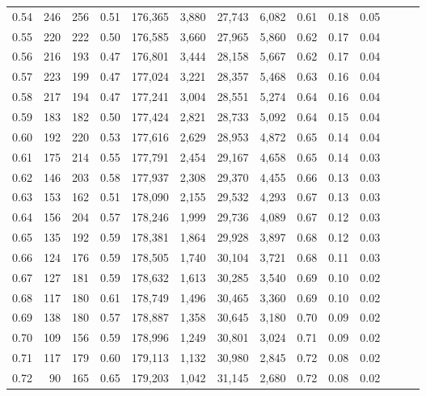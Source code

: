 \begin{tabular}{rrrrrrrrrrrrrr}
0.54 &     246 &  256 &  0.51 &  176,365 &    3,880 &  27,743 &   6,082 &  0.61 &  0.18 &      0.05 \\
0.55 &     220 &  222 &  0.50 &  176,585 &    3,660 &  27,965 &   5,860 &  0.62 &  0.17 &      0.04 \\
0.56 &     216 &  193 &  0.47 &  176,801 &    3,444 &  28,158 &   5,667 &  0.62 &  0.17 &      0.04 \\
0.57 &     223 &  199 &  0.47 &  177,024 &    3,221 &  28,357 &   5,468 &  0.63 &  0.16 &      0.04 \\
0.58 &     217 &  194 &  0.47 &  177,241 &    3,004 &  28,551 &   5,274 &  0.64 &  0.16 &      0.04 \\
0.59 &     183 &  182 &  0.50 &  177,424 &    2,821 &  28,733 &   5,092 &  0.64 &  0.15 &      0.04 \\
0.60 &     192 &  220 &  0.53 &  177,616 &    2,629 &  28,953 &   4,872 &  0.65 &  0.14 &      0.04 \\
0.61 &     175 &  214 &  0.55 &  177,791 &    2,454 &  29,167 &   4,658 &  0.65 &  0.14 &      0.03 \\
0.62 &     146 &  203 &  0.58 &  177,937 &    2,308 &  29,370 &   4,455 &  0.66 &  0.13 &      0.03 \\
0.63 &     153 &  162 &  0.51 &  178,090 &    2,155 &  29,532 &   4,293 &  0.67 &  0.13 &      0.03 \\
0.64 &     156 &  204 &  0.57 &  178,246 &    1,999 &  29,736 &   4,089 &  0.67 &  0.12 &      0.03 \\
0.65 &     135 &  192 &  0.59 &  178,381 &    1,864 &  29,928 &   3,897 &  0.68 &  0.12 &      0.03 \\
0.66 &     124 &  176 &  0.59 &  178,505 &    1,740 &  30,104 &   3,721 &  0.68 &  0.11 &      0.03 \\
0.67 &     127 &  181 &  0.59 &  178,632 &    1,613 &  30,285 &   3,540 &  0.69 &  0.10 &      0.02 \\
0.68 &     117 &  180 &  0.61 &  178,749 &    1,496 &  30,465 &   3,360 &  0.69 &  0.10 &      0.02 \\
0.69 &     138 &  180 &  0.57 &  178,887 &    1,358 &  30,645 &   3,180 &  0.70 &  0.09 &      0.02 \\
0.70 &     109 &  156 &  0.59 &  178,996 &    1,249 &  30,801 &   3,024 &  0.71 &  0.09 &      0.02 \\
0.71 &     117 &  179 &  0.60 &  179,113 &    1,132 &  30,980 &   2,845 &  0.72 &  0.08 &      0.02 \\
0.72 &      90 &  165 &  0.65 &  179,203 &    1,042 &  31,145 &   2,680 &  0.72 &  0.08 &      0.02 \\

\end{tabular}

